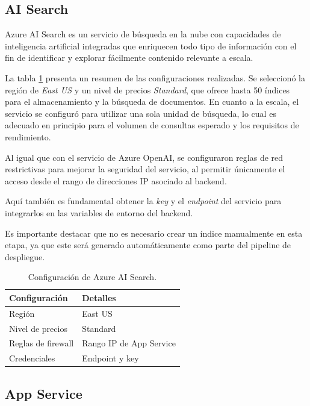 \subsection{AI Search}

Azure AI Search es un servicio de búsqueda en la nube con capacidades de inteligencia artificial integradas 
que enriquecen todo tipo de información con el fin de identificar y explorar fácilmente contenido relevante a escala.

La tabla \ref{tab:config-ai-search} presenta un resumen de las configuraciones realizadas. Se seleccionó la región de \textit{East US} y un nivel de precios 
\textit{Standard}, que ofrece hasta 50 índices para el almacenamiento y la búsqueda de documentos. En cuanto a la escala, el servicio se configuró para 
utilizar una sola unidad de búsqueda, lo cual es adecuado en principio para el volumen de consultas esperado y los requisitos de rendimiento.

Al igual que con el servicio de Azure OpenAI, se configuraron reglas de red restrictivas para mejorar la seguridad del servicio, al permitir 
únicamente el acceso desde el rango de direcciones IP asociado al backend. 

Aquí también es fundamental obtener la \textit{key} y el \textit{endpoint} del servicio para integrarlos en las variables de entorno del backend.

Es importante destacar que no es necesario crear un índice manualmente en esta etapa, ya que este será generado automáticamente como parte del pipeline de despliegue.

\begin{table}[h]
	\centering
	\caption[Configuración de Azure AI Search]{Configuración de Azure AI Search.}
	\begin{tabular}{l l}    
		\toprule
		\textbf{Configuración} 	 & \textbf{Detalles} 	   \\
		\midrule
		Región                   &	East US 			   \\		
		Nivel de precios         & Standard				   \\
		Reglas de firewall       & Rango IP de App Service \\
    	Credenciales	         & Endpoint y key 		   \\
		\bottomrule
		\hline
	\end{tabular}
	\label{tab:config-ai-search}
\end{table}

\subsection{App Service}


